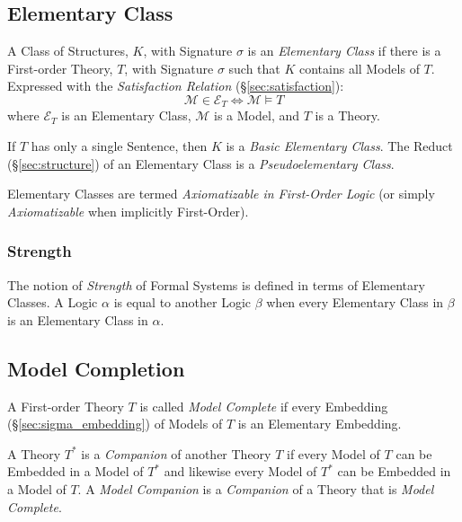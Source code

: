 \subsection{Elementary Class}\label{sec:elementary_class}

A Class of Structures, $K$, with Signature $\sigma$ is an
\emph{Elementary Class} if there is a First-order Theory, $T$, with
Signature $\sigma$ such that $K$ contains all Models of $T$.
Expressed with the \emph{Satisfaction Relation}
(\S\ref{sec:satisfaction}):
\[
  \mathcal{M} \in \mathcal{E}_T \Leftrightarrow \mathcal{M} \vDash T
\]
where $\mathcal{E}_T$ is an Elementary Class, $\mathcal{M}$ is a
Model, and $T$ is a Theory.

If $T$ has only a single Sentence, then $K$ is a \emph{Basic
  Elementary Class}. The Reduct (\S\ref{sec:structure}) of an
Elementary Class is a \emph{Pseudoelementary Class}.

Elementary Classes are termed \emph{Axiomatizable in First-Order
  Logic} (or simply \emph{Axiomatizable} when implicitly First-Order).



\subsubsection{Strength}\label{sec:strength}

The notion of \emph{Strength} of Formal Systems is defined in terms of
Elementary Classes. A Logic $\alpha$ is equal to another Logic $\beta$
when every Elementary Class in $\beta$ is an Elementary Class in
$\alpha$.



\subsection{Model Completion}\label{sec:model_completion}

A First-order Theory $T$ is called \emph{Model Complete} if every
Embedding (\S\ref{sec:sigma_embedding}) of Models of $T$ is an
Elementary Embedding.

A Theory $T^*$ is a \emph{Companion} of another Theory $T$ if every
Model of $T$ can be Embedded in a Model of $T^*$ and likewise every
Model of $T^*$ can be Embedded in a Model of $T$. A \emph{Model
  Companion} is a \emph{Companion} of a Theory that is \emph{Model
  Complete}.

